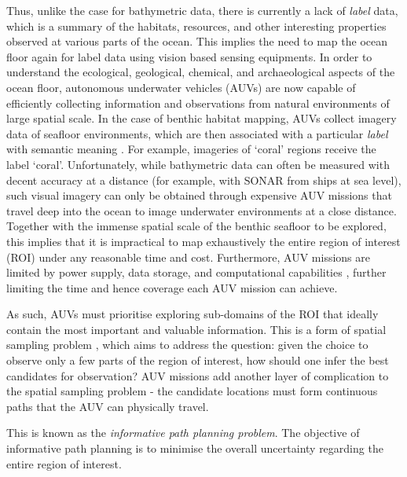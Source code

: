 		Thus, unlike the case for bathymetric data, there is currently a lack of \textit{label} data, which is a summary of the habitats, resources, and other interesting properties observed at various parts of the ocean. This implies the need to map the ocean floor again for label data using vision based sensing equipments. In order to understand the ecological, geological, chemical, and archaeological aspects of the ocean floor, autonomous underwater vehicles (AUVs) are now capable of efficiently collecting information and observations from natural environments of large spatial scale. In the case of benthic habitat mapping, AUVs collect imagery data of seafloor environments, which are then associated with a particular \textit{label} with semantic meaning \citep{Steinberg2015128}. For example, imageries of `coral' regions receive the label `coral'. Unfortunately, while bathymetric data can often be measured with decent accuracy at a distance (for example, with SONAR from ships at sea level), such visual imagery can only be obtained through expensive AUV missions that travel deep into the ocean to image underwater environments at a close distance. Together with the immense spatial scale of the benthic seafloor to be explored, this implies that it is impractical to map exhaustively the entire region of interest (ROI) under any reasonable time and cost. Furthermore, AUV missions are limited by power supply, data storage, and computational capabilities \citep{AsherBender}, further limiting the time and hence coverage each AUV mission can achieve. 
		
		As such, AUVs must prioritise exploring sub-domains of the ROI that ideally contain the most important and valuable information. This is a form of spatial sampling problem \citep{Rigby:ROB20372}, which aims to address the question: given the choice to observe only a few parts of the region of interest, how should one infer the best candidates for observation? AUV missions add another layer of complication to the spatial sampling problem - the candidate locations must form continuous paths that the AUV can physically travel.
		
		This is known as the \textit{informative path planning problem}. The objective of informative path planning is to minimise the overall uncertainty regarding the entire region of interest.
		
